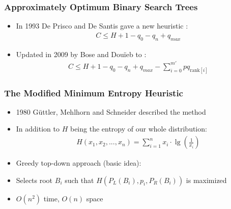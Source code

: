\documentclass{beamer}
\theoremstyle{plain}
\begin{document}
\begin{frame} \frametitle{Approximately Optimum Binary Search Trees}

\begin{itemize}
\item In 1993 De Prisco and De Santis gave a new heuristic \cite{de1993binary}:
\begin{align*}
C \leq H+1-q_0-q_n+q_{max}
\end{align*}
\item Updated in 2009 by Bose and Dou\"{i}eb to \cite{bose2009efficient}:
\begin{align*}
C \leq H + 1 - q_0 - q_n + q_{max} - \sum_{i=0}^{m'} pq_{\text{rank}[i]}
\end{align*}

\end{itemize}
\end{frame}

\begin{frame} \frametitle{The Modified Minimum Entropy Heuristic}

\begin{itemize}

\item<1-> 1980 G{\"u}ttler, Mehlhorn and Schneider described the method

\item<2-> In addition to $H$ being the entropy of our whole distribution:
\begin{align*}
H(x_1,x_2,...,x_n) = \sum_{i=1}^{n} x_i\cdot\lg \left(\frac{1}{x_i} \right)
\end{align*}

\item<3-> Greedy top-down approach (basic idea):

\item<4-> Selects root $B_i$ such that $H(P_L(B_i), p_i, P_R(B_i))$ is maximized

\item<5-> $O(n^2)$ time, $O(n)$ space

\end{itemize}

\end{frame}
\end{document}

